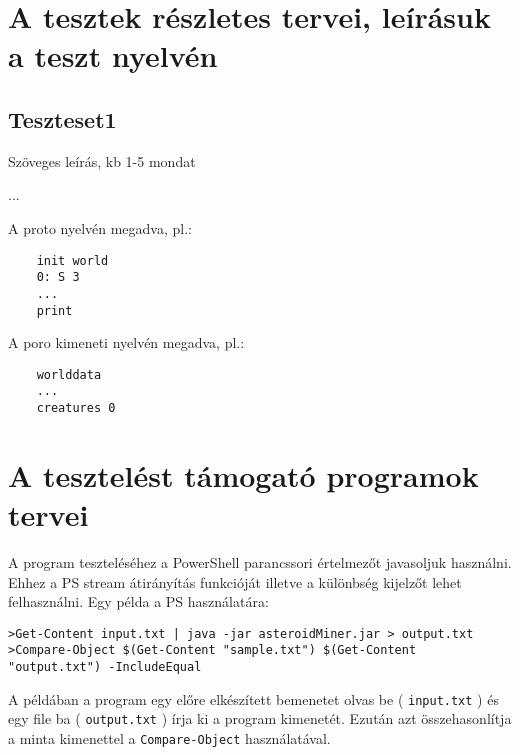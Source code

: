 \documentclass[../../projlab]{subfiles}
\begin{document}
\section{A tesztek részletes tervei, leírásuk a teszt nyelvén}

\subsection{Teszteset1}
\begin{test-case-description}
    Szöveges leírás, kb 1-5 mondat
\end{test-case-description}
\begin{test-case-function}
    ...
\end{test-case-function}
\begin{test-case-input}
    A proto nyelvén megadva, pl.:
    \begin{verbatim}
    init world
    0: S 3
    ...
    print
    \end{verbatim}
\end{test-case-input}
\begin{test-case-output}
    A poro kimeneti nyelvén megadva, pl.:
    \begin{verbatim}
    worlddata
    ...
    creatures 0
    \end{verbatim}
\end{test-case-output}

\section{A tesztelést támogató programok tervei}
A program teszteléséhez a PowerShell parancssori értelmezőt javasoljuk használni.
Ehhez a PS stream átirányítás funkcióját illetve a különbség kijelzőt lehet felhasználni.
Egy példa a PS használatára:

\begin{adjustwidth}{-30pt}{0pt}
\begin{verbatim}
>Get-Content input.txt | java -jar asteroidMiner.jar > output.txt
>Compare-Object $(Get-Content "sample.txt") $(Get-Content "output.txt") -IncludeEqual
\end{verbatim}
\end{adjustwidth}

A példában a program egy előre elkészített bemenetet olvas be ( \verb"input.txt" )
és egy file ba ( \verb"output.txt" ) írja ki a program kimenetét.
Ezután azt összehasonlítja a minta kimenettel a \verb"Compare-Object" használatával.
\end{document}
